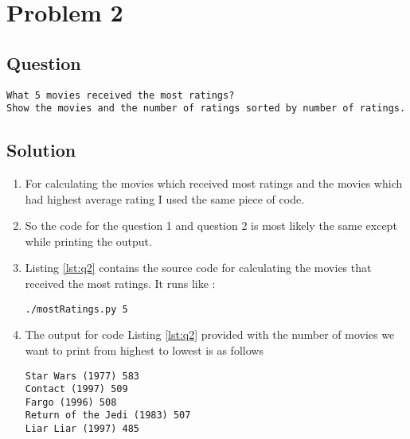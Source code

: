 \section{Problem 2}
\label{part2}
\subsection*{Question}
\begingroup
\begin{verbatim}
What 5 movies received the most ratings? 
Show the movies and the number of ratings sorted by number of ratings.
\end{verbatim}

\subsection{Solution}
\begin{enumerate}
\item For calculating the movies which received most ratings and the movies which had highest average rating I used the same piece of code. 
\item So the code for the question 1 and question 2 is most likely the same except while printing the output. 
\item Listing \ref{lst:q2} contains the source code for calculating the movies that received the most ratings. It runs like :
\begin{lstlisting}[frame=single]
./mostRatings.py 5
\end{lstlisting}
\item The output for code Listing \ref{lst:q2} provided with the number of movies we want to print from highest to lowest is as follows
\begin{lstlisting}[frame=single]
Star Wars (1977) 583
Contact (1997) 509
Fargo (1996) 508
Return of the Jedi (1983) 507
Liar Liar (1997) 485
\end{lstlisting}

\end{enumerate}

\newpage
